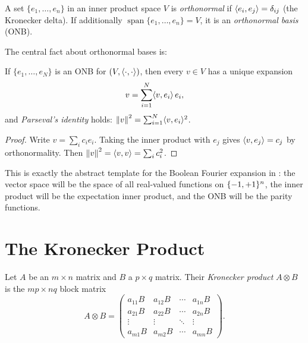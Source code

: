 \begin{definition}\label{def:onb}
A set $\{e_1, \ldots, e_n\}$ in an inner product space $V$ is
\emph{orthonormal} if $\langle e_i, e_j \rangle = \delta_{ij}$ (the Kronecker delta).
If additionally $\operatorname{span}\{e_1,\ldots,e_n\} = V$, it is an
\emph{orthonormal basis} (ONB).
\end{definition}

The central fact about orthonormal bases is:

\begin{proposition}\label{prop:fourier-finite}
If $\{e_1, \ldots, e_N\}$ is an ONB for $(V, \langle \cdot, \cdot \rangle)$, then
every $v \in V$ has a unique expansion
\[
  v = \sum_{i=1}^{N} \langle v, e_i \rangle\, e_i,
\]
and \emph{Parseval's identity} holds:
$\left\| v \right\|^2 = \sum_{i=1}^{N} \langle v, e_i \rangle^2$.
\end{proposition}

\begin{proof}
Write $v = \sum_i c_i e_i$. Taking the inner product with $e_j$ gives
$\langle v, e_j \rangle = c_j$ by orthonormality. Then
$\left\| v \right\|^2 = \langle v, v \rangle = \sum_i c_i^2$.
\end{proof}

This is exactly the abstract template for the Boolean Fourier expansion
in : the vector space will be the space of all
real-valued functions on $\{-1,+1\}^n$, the inner product will be the
expectation inner product, and the ONB will be the parity functions.


\section{The Kronecker Product}\label{sec:kronecker}

\begin{definition}\label{def:kronecker}
Let $A$ be an $m \times n$ matrix and $B$ a $p \times q$ matrix. Their
\emph{Kronecker product} $A \otimes B$ is the $mp \times nq$ block matrix
\[
  A \otimes B =
  \begin{pmatrix}
    a_{11} B & a_{12} B & \cdots & a_{1n} B \\
    a_{21} B & a_{22} B & \cdots & a_{2n} B \\
    \vdots & \vdots & \ddots & \vdots \\
    a_{m1} B & a_{m2} B & \cdots & a_{mn} B
  \end{pmatrix}.
\]
\end{definition}

